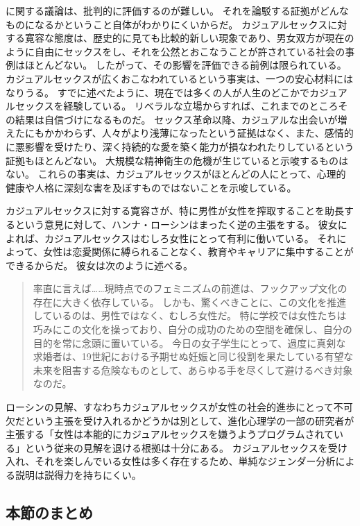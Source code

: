 \documentclass[paper=a4,book,openany]{jlreq} \usepackage{mystyle}
\begin{document}
に関する議論は、批判的に評価するのが難しい。
それを論駁する証拠がどんなものになるかということ自体がわかりにくいからだ。
カジュアルセックスに対する寛容な態度は、歴史的に見ても比較的新しい現象であり、男女双方が現在のように自由にセックスをし、それを公然とおこなうことが許されている社会の事例はほとんどない。
したがって、その影響を評価できる前例は限られている。
カジュアルセックスが広くおこなわれているという事実は、一つの安心材料にはなりうる。
すでに述べたように、現在では多くの人が人生のどこかでカジュアルセックスを経験している。
リベラルな立場からすれば、これまでのところその結果は自信づけになるものだ。
セックス革命以降、カジュアルな出会いが増えたにもかかわらず、人々がより浅薄になったという証拠はなく、また、感情的に悪影響を受けたり、深く持続的な愛を築く能力が損なわれたりしているという証拠もほとんどない。
大規模な精神衛生の危機が生じていると示唆するものはない。
これらの事実は、カジュアルセックスがほとんどの人にとって、心理的健康や人格に深刻な害を及ぼすものではないことを示唆している。

カジュアルセックスに対する寛容さが、特に男性が女性を搾取することを助長するという意見に対して、ハンナ・ローシンはまったく逆の主張をする。
彼女によれば、カジュアルセックスはむしろ女性にとって有利に働いている。
それによって、女性は恋愛関係に縛られることなく、教育やキャリアに集中することができるからだ。
彼女は次のように述べる。

\begin{quote}
  率直に言えば……現時点でのフェミニズムの前進は、フックアップ文化の存在に大きく依存している。
しかも、驚くべきことに、この文化を推進しているのは、男性ではなく、むしろ女性だ。
特に学校では女性たちは巧みにこの文化を操っており、自分の成功のための空間を確保し、自分の目的を常に念頭に置いている。
今日の女子学生にとって、過度に真剣な求婚者は、19世紀における予期せぬ妊娠と同じ役割を果たしている{\DDASH}有望な未来を阻害する危険なものとして、あらゆる手を尽くして避けるべき対象なのだ。
\citep{rosin12:_boys_side}
\end{quote}

ローシンの見解、すなわちカジュアルセックスが女性の社会的進歩にとって不可欠だという主張を受け入れるかどうかは別として、進化心理学の一部の研究者が主張する「女性は本能的にカジュアルセックスを嫌うようプログラムされている」という従来の見解を退ける根拠は十分にある。
カジュアルセックスを受け入れ、それを楽しんでいる女性は多く存在するため、単純なジェンダー分析による説明は説得力を持ちにくい。

\subsection{本節のまとめ}
\end{document}
